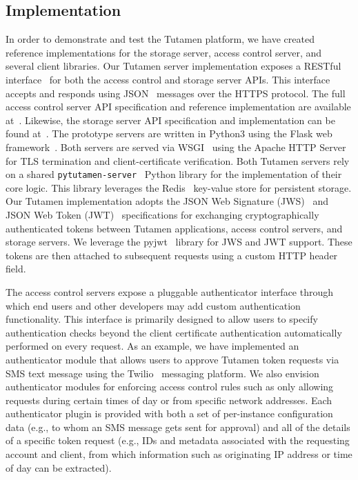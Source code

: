\subsection{Implementation}

In order to demonstrate and test the Tutamen platform, we have created
reference implementations for the storage server, access control
server, and several client libraries. Our Tutamen server
implementation exposes a RESTful interface~\cite{fielding2000} for
both the access control and storage server APIs. This interface
accepts and responds using JSON~\cite{json} messages over the HTTPS
protocol. The full access control server API specification and
reference implementation are available
at~\cite{src-tutamen-apiaccesscontrol}. Likewise, the storage server
API specification and implementation can be found
at~\cite{src-tutamen-apistorage}. The prototype servers are written in
Python3 using the Flask web framework~\cite{python-flask}. Both
servers are served via WSGI~\cite{pep3333} using the Apache HTTP
Server~\cite{apache} for TLS termination and client-certificate
verification. Both Tutamen servers rely on a shared
\texttt{pytutamen-server}~\cite{src-tutamen-pytutamenserver} Python
library for the implementation of their core logic. This library
leverages the Redis~\cite{redis} key-value store for persistent
storage. Our Tutamen implementation adopts the JSON Web Signature
(JWS)~\cite{rfc7515} and JSON Web Token (JWT)~\cite{rfc7519}
specifications for exchanging cryptographically authenticated tokens
between Tutamen applications, access control servers, and storage
servers. We leverage the pyjwt~\cite{pyjwt} library for JWS and JWT
support. These tokens are then attached to subsequent requests using a
custom HTTP header field.

The access control servers expose a pluggable authenticator interface
through which end users and other developers may add custom
authentication functionality. This interface is primarily designed to
allow users to specify authentication checks beyond the client
certificate authentication automatically performed on every
request. As an example, we have implemented an authenticator module
that allows users to approve Tutamen token requests via SMS text
message using the Twilio~\cite{twilio} messaging platform. We also
envision authenticator modules for enforcing access control rules such
as only allowing requests during certain times of day or from specific
network addresses. Each authenticator plugin is provided with both a
set of per-instance configuration data (e.g., to whom an SMS message
gets sent for approval) and all of the details of a specific token
request (e.g., IDs and metadata associated with the requesting account
and client, from which information such as originating IP address or
time of day can be extracted).

